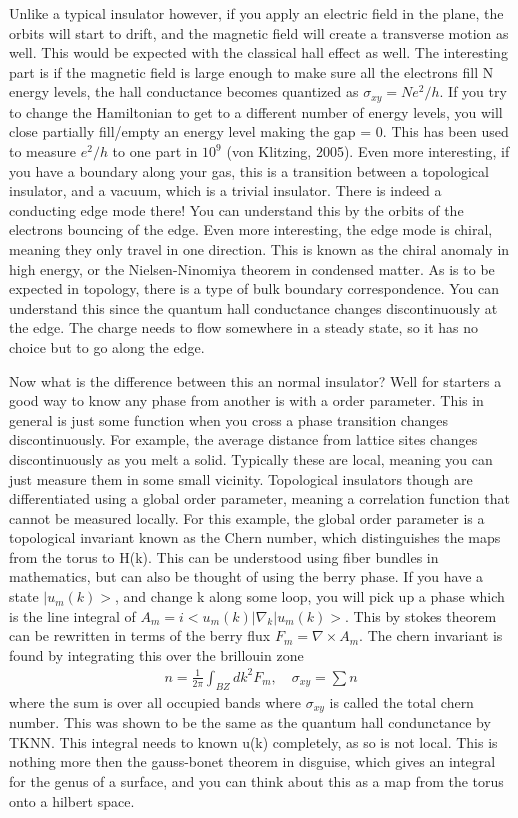 Unlike a typical insulator however, if you apply an electric field in the plane, the orbits will start to drift, and the magnetic field will create a transverse motion as well. This would be expected with the classical hall effect as well. The interesting part is if the magnetic field is large enough to make sure all the electrons fill N energy levels, the hall conductance becomes quantized as $\sigma_{xy}=Ne^2/h$. If you try to change the Hamiltonian to get to a different number of  energy levels, you will close partially fill/empty an energy level making the gap = 0. This has been used to measure $e^2/h$ to one part
in $10^9$ (von Klitzing, 2005). Even more interesting, if you have a boundary along your gas, this is a transition between a topological insulator, and a vacuum, which is a trivial insulator. There is indeed a conducting edge mode there! You can understand this by the orbits of the electrons bouncing of the edge. Even more interesting, the edge mode is chiral, meaning they only travel in one direction. This is known as the chiral anomaly in high energy, or the Nielsen-Ninomiya theorem in condensed matter. As is to be expected in topology, there is a type of bulk boundary correspondence. You can understand this since the quantum hall conductance changes discontinuously at the edge. The charge needs to flow somewhere in a steady state, so it has no choice but to go along the edge.

Now what is the difference between this an normal insulator? Well for starters a good way to know any phase from another is with a order parameter. This in general is just some function when you cross a phase transition changes discontinuously. For example, the average distance from lattice sites changes discontinuously as you melt a solid. Typically these are local, meaning you can just measure them in some small vicinity. Topological insulators though are differentiated using a global order parameter, meaning a correlation function that cannot be measured locally. For this example, the global order parameter is a topological invariant known as the Chern number, which distinguishes the maps from the torus to H(k). This can be understood using fiber bundles in mathematics, but can also be thought of using the berry phase. If you have a state $|u_m(k)>$, and change k along some loop, you will pick up a phase which is the line integral of $A_m = i <u_m(k)|\nabla_k|u_m(k)>$. This by stokes theorem can be rewritten in terms of the berry flux $F_m=\nabla \times A_m$. The chern invariant is found by integrating this over the brillouin zone
\begin{align}
 n=\frac{1}{2\pi}\int_{BZ}dk^2 F_m, \quad \sigma_{xy}=\sum n
\end{align}
where the sum is over all occupied bands where $\sigma_{xy}$ is called the total chern number. This was shown to be the same as the quantum hall condunctance by TKNN. This integral needs to known u(k) completely, as so is not local. This is nothing more then the gauss-bonet theorem in disguise, which gives an integral for the genus of a surface, and you can think about this as a map from the torus onto a hilbert space.

